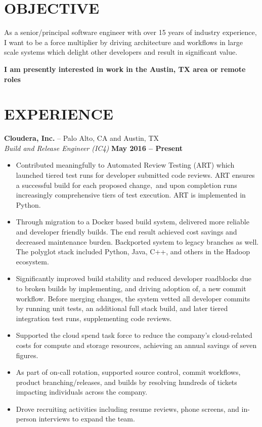 \documentclass[line, margin]{res}
\begin{document}
\address{ Austin, TX $\bullet$ (206) 931-9916 $\bullet$ cmyers@cmyers.org $\bullet$ https://cmyers.org }

\begin{resume}

\section{OBJECTIVE}
As a senior/principal software engineer with over 15 years of industry
experience, I want to be a force multiplier by driving architecture and
workflows in large scale systems which delight other developers and result in
significant value.

{\bf I am presently interested in work in the Austin, TX area or remote roles}

\section{EXPERIENCE}
{\bf Cloudera, Inc.} -- Palo Alto, CA and Austin, TX
\\
\textit{Build and Release Engineer (IC4)} \hfill {\bf May 2016 -- Present}
\\
\begin{itemize}
\item
Contributed meaningfully to Automated Review Testing (ART) which
launched tiered test runs for developer submitted code reviews.  ART ensures a successful build for each proposed change, and upon completion runs increasingly comprehensive tiers of
test execution.  ART is implemented in Python.
\item
Through migration to a Docker based build system, delivered more reliable and
developer friendly builds.  The end result achieved cost savings and decreased
maintenance burden.  Backported system to legacy branches as well.  The
polyglot stack included Python, Java, C++, and others in the Hadoop ecosystem.
\item
Significantly improved build stability and reduced developer roadblocks due to
broken builds by implementing, and driving adoption of, a new commit workflow.
Before merging changes, the system vetted all developer commits by
running unit tests, an additional full stack build, and later tiered
integration test runs, supplementing code reviews.
\item
Supported the cloud spend task force to reduce the company's cloud-related costs
for compute and storage resources, achieving an annual savings of seven figures.
\item
As part of on-call rotation, supported source control, commit workflows, product
branching/releases, and builds by resolving hundreds of tickets impacting
individuals across the company.
\item
Drove recruiting activities including resume reviews, phone screens,
and in-person interviews to expand the team.
\end{itemize}


\end{resume}
\end{document}
